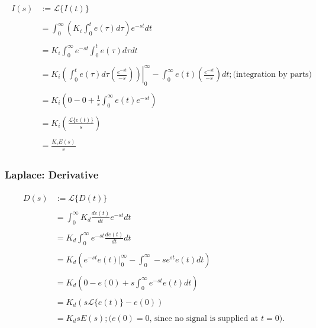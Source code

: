 \documentclass[11pt]{article}
\theoremstyle{definition}
\begin{document}
\begin{align*}
    \begin{split}
        I(s) &:= \mathcal{L}\{I(t)\} \\\\
             &= \int_{0}^{\infty}\left(K_{i}\int_{0}^{t}e(\tau)d\tau\right)e^{-st}dt \\\\
             &= K_{i}\int_{0}^{\infty}e^{-st}\int_{0}^{t}e(\tau)d\tau dt \\\\
             &= \left.K_{i}\left(\int_{0}^{t}e(\tau)d\tau \left(\frac{e^{-st}}{-s}\right)\right)\right|_{0}^{\infty} - \int_{0}^{\infty}e(t)\left(\frac{e^{-st}}{-s}\right)dt; \text{(integration by parts)} \\\\
             &= K_{i}\left(0 - 0 + \frac{1}{s}\int_{0}^{\infty}e(t)e^{-st}\right) \\\\
             &= K_{i}\left(\frac{\mathcal{L}\{e(t)\}}{s}\right) \\\\
             &= \frac{K_{i}E(s)}{s} 
    \end{split}
\end{align*}

\subsubsection{Laplace: Derivative}

\begin{align*}
\begin{split}
    D(s) &:= \mathcal{L}\{D(t)\} \\\\
         &= \int_{0}^{\infty}K_{d}\frac{de(t)}{dt}e^{-st}dt \\\\
         &= K_{d} \int_{0}^{\infty}e^{-st}\frac{de(t)}{dt}dt \\\\
         &= K_{d}\left(e^{-st}e(t)\Bigr\rvert_{0}^{\infty} - \int_{0}^{\infty}-se^{st}e(t)dt\right) \\\\
         &= K_{d}\left(0 - e(0) + s \int_{0}^{\infty}e^{-st}e(t)dt\right) \\\\
         &= K_{d}\left(s\mathcal{L}\{e(t)\} - e(0)\right) \\\\
         &= K_{d}sE(s); \text{($e(0) = 0$, since no signal is supplied at $t = 0$).}
\end{split}
\end{align*}
\end{document}
